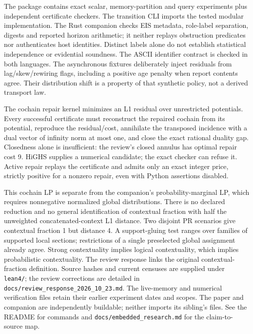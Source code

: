 \documentclass[
  10pt,
]{article}
\begin{document}
The package contains exact scalar, memory-partition and query experiments plus independent certificate checkers. The transition CLI imports the tested modular implementation. The Rust companion checks EIS metadata, role-label separation, digests and reported horizon arithmetic; it neither replays obstruction predicates nor authenticates host identities. Distinct labels alone do not establish statistical independence or evidential soundness. The ASCII identifier contract is checked in both languages. The asynchronous fixtures deliberately inject residuals from lag/skew/rewiring flags, including a positive age penalty when report contents agree. Their distribution shift is a property of that synthetic policy, not a derived transport law.

The cochain repair kernel minimizes an L1 residual over unrestricted potentials. Every successful certificate must reconstruct the repaired cochain from its potential, reproduce the residual/cost, annihilate the transposed incidence with a dual vector of infinity norm at most one, and close the exact rational duality gap. Closedness alone is insufficient: the review's closed annulus has optimal repair cost 9. HiGHS supplies a numerical candidate; the exact checker can refuse it. Active repair replays the certificate and admits only an exact integer price, strictly positive for a nonzero repair, even with Python assertions disabled.

This cochain LP is separate from the companion's probability-marginal LP, which requires nonnegative normalized global distributions. There is no declared reduction and no general identification of contextual fraction with half the unweighted concatenated-context L1 distance. Two disjoint PR scenarios give contextual fraction 1 but distance 4. A support-gluing test ranges over families of supported local sections; restrictions of a single preselected global assignment already agree. Strong contextuality implies logical contextuality, which implies probabilistic contextuality. The review response links the original contextual-fraction definition. Source hashes and current censuses are supplied under \texttt{lean4/}; the review corrections are detailed in \texttt{docs/review\_response\_2026\_10\_23.md}. The live-memory and numerical verification files retain their earlier experiment dates and scopes. The paper and companion are independently buildable; neither imports its sibling's files. See the README for commands and \texttt{docs/embedded\_research.md} for the claim-to-source map.
\end{document}
